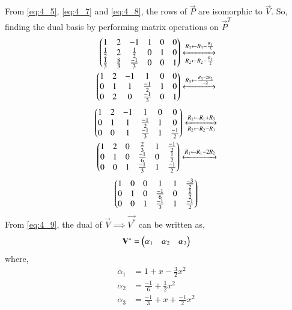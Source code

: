 \documentclass[journal,12pt,twocolumn]{IEEEtran}
\begin{document}
From \eqref{eq:4_5}, \eqref{eq:4_7} and \eqref{eq:4_8}, the rows of $\vec{P}$ are isomorphic to $\vec{V}$. So, finding the dual basis by performing matrix operations on $\vec{P}^T$
\begin{align}
    \begin{pmatrix}1 & 2 & -1 & 1 & 0 & 0 \\
    \frac{1}{2} & 2 & \frac{1}{2} & 0 & 1 & 0\\
    \frac{1}{3} & \frac{8}{3} & \frac{-1}{3} & 0 & 0 & 1\end{pmatrix} \xleftrightarrow[R_2\leftarrow R_2-\frac{R_1}{2}]{R_3\leftarrow R_3-\frac{R_1}{3}} \nonumber \\
    \begin{pmatrix}1 & 2 & -1 & 1 & 0 & 0 \\ 
    0 & 1 & 1 & \frac{-1}{2} & 1 & 0 \\
    0 & 2 & 0 & \frac{-1}{3} & 0 & 1\end{pmatrix}
    \xleftrightarrow[]{R_3 \leftarrow \frac{R_3-2R_2}{-2}} \nonumber
\end{align}
\begin{align}
    \begin{pmatrix}1 & 2 & -1 & 1 & 0 & 0 \\ 
    0 & 1 & 1 & \frac{-1}{2} & 1 & 0 \\
    0 & 0 & 1 & \frac{-1}{3} & 1 & \frac{-1}{2}\end{pmatrix} 
    \xleftrightarrow[R_2 \leftarrow R_2 - R_3]{R_1 \leftarrow R_1 + R_3} \nonumber \\
    \begin{pmatrix}1 & 2 & 0 & \frac{2}{3} & 1 & \frac{-1}{2} \\ 
    0 & 1 & 0 & \frac{-1}{6} & 0 & \frac{1}{2} \\
    0 & 0 & 1 & \frac{-1}{3} & 1 & \frac{-1}{2}\end{pmatrix} 
    \xleftrightarrow[]{R_1\leftarrow R_1-2R_2} \nonumber
\end{align}
\begin{align}
    \begin{pmatrix}1 & 0 & 0 & 1 & 1 & \frac{-3}{2} \\
    0 & 1 & 0 & \frac{-1}{6} & 0 & \frac{1}{2} \\
    0 & 0 & 1 & \frac{-1}{3} & 1 & \frac{-1}{2}\end{pmatrix} \label{eq:4_9}
\end{align}
From \eqref{eq:4_9}, the dual of $\vec{V} \implies \vec{V^*}$ can be written as,
\begin{align}
    \mathbf{V^*} = \begin{pmatrix}\alpha_1 & \alpha_2 & \alpha_3\end{pmatrix} \label{eq:4_10}
\end{align}
where,
\begin{align}
    \alpha_1 &= 1 + x - \frac{3}{2}x^2 \\
    \alpha_2 &= \frac{-1}{6} + \frac{1}{2}x^2 \\
    \alpha_3 &= \frac{-1}{3} + x + \frac{-1}{2}x^2
\end{align}
\end{document}
